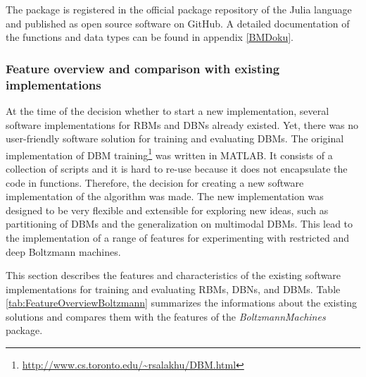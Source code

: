 \documentclass[12pt]{article}
\newcommand{\apkg}[1]{\emph{#1}}
\begin{document}
The package is registered in the official package repository of the Julia language and published as open source software on GitHub.
A detailed documentation of the functions and data types can be found in appendix \ref{BMDoku}.


\subsubsection{Feature overview and comparison with existing implementations}\label{BMfeatures}

At the time of the decision whether to start a new implementation, several software implementations for RBMs and DBNs already existed.
Yet, there was no user-friendly software solution for training and evaluating DBMs.
The original implementation of DBM training\footnote{\url{http://www.cs.toronto.edu/~rsalakhu/DBM.html}} was written in MATLAB.
It consists of a collection of scripts and it is hard to re-use because it does not encapsulate the code in functions.
Therefore, the decision for creating a new software implementation of the algorithm was made.
The new implementation was designed to be very flexible and extensible for exploring new ideas, such as partitioning of DBMs and the generalization on multimodal DBMs.
This lead to the implementation of a range of features for experimenting with restricted and deep Boltzmann machines.

This section describes the features and characteristics of the existing software implementations for training and evaluating RBMs, DBNs, and DBMs.
Table \ref{tab:FeatureOverviewBoltzmann} summarizes the informations about the existing solutions and compares them with the features of the \apkg{BoltzmannMachines} package.
\end{document}
